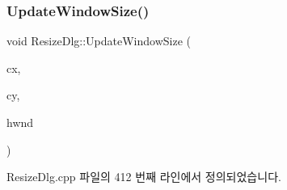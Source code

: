 \subsubsection{\texorpdfstring{Update\+Window\+Size()}{UpdateWindowSize()}}
{\footnotesize\ttfamily void Resize\+Dlg\+::\+Update\+Window\+Size (\begin{DoxyParamCaption}\item[{\mbox{\hyperlink{getopt1_8c_a2c212835823e3c54a8ab6d95c652660e}{const}} \mbox{\hyperlink{_util_8cpp_a0ef32aa8672df19503a49fab2d0c8071}{int}}}]{cx,  }\item[{\mbox{\hyperlink{getopt1_8c_a2c212835823e3c54a8ab6d95c652660e}{const}} \mbox{\hyperlink{_util_8cpp_a0ef32aa8672df19503a49fab2d0c8071}{int}}}]{cy,  }\item[{H\+W\+ND}]{hwnd }\end{DoxyParamCaption})}



Resize\+Dlg.\+cpp 파일의 412 번째 라인에서 정의되었습니다.



